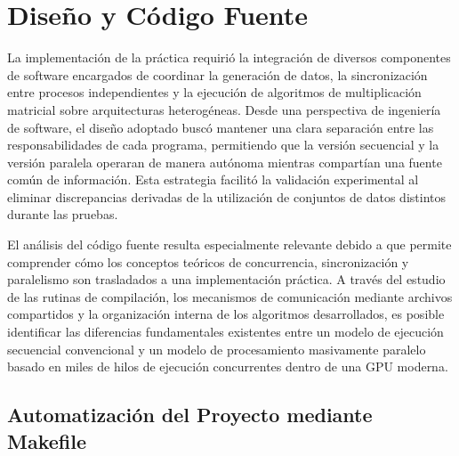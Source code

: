 \section{Diseño y Código Fuente}

La implementación de la práctica requirió la integración de diversos componentes de software encargados de coordinar la generación de datos, la sincronización entre procesos independientes y la ejecución de algoritmos de multiplicación matricial sobre arquitecturas heterogéneas. Desde una perspectiva de ingeniería de software, el diseño adoptado buscó mantener una clara separación entre las responsabilidades de cada programa, permitiendo que la versión secuencial y la versión paralela operaran de manera autónoma mientras compartían una fuente común de información. Esta estrategia facilitó la validación experimental al eliminar discrepancias derivadas de la utilización de conjuntos de datos distintos durante las pruebas.

El análisis del código fuente resulta especialmente relevante debido a que permite comprender cómo los conceptos teóricos de concurrencia, sincronización y paralelismo son trasladados a una implementación práctica. A través del estudio de las rutinas de compilación, los mecanismos de comunicación mediante archivos compartidos y la organización interna de los algoritmos desarrollados, es posible identificar las diferencias fundamentales existentes entre un modelo de ejecución secuencial convencional y un modelo de procesamiento masivamente paralelo basado en miles de hilos de ejecución concurrentes dentro de una GPU moderna.

\subsection{Automatización del Proyecto mediante Makefile}

